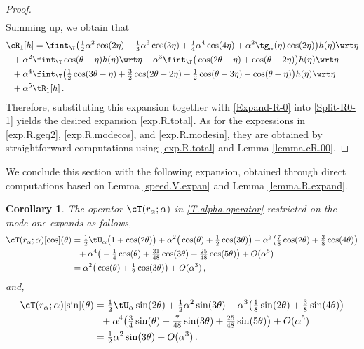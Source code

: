 \documentclass[a4paper,reqno,10pt]{article}
\newtheorem{cor}{Corollary}[section]
\begin{document}
\begin{proof}
\begin{align}
	\end{align}
Summing up, we obtain that
	\begin{align*}%
	&	\cR_{1}[h]  =   \fint_{\T} \big( \tfrac12 \alpha^2 \cos(2\eta) -\tfrac13 \alpha^3 \cos(3\eta) + \tfrac14 \alpha^4 \cos(4\eta) +\alpha^2 \tg_{\alpha}(\eta) \cos(2\eta)  \big) h(\eta) \wrt\eta \\
		& \ \  + {\alpha^2}\fint_{\T}\cos(\theta-\eta) h(\eta) \wrt \eta - {\alpha^3} \fint_{\T}\big( \cos(2\theta-\eta) + \cos(\theta-2\eta) \big)h(\eta) \wrt \eta  \\
	& \ \    + {\alpha^4} \fint_{\T} \big( \tfrac12\cos(3\theta-\eta) + \tfrac32\cos(2\theta-2\eta) +\tfrac12 \cos(\theta-3\eta)  -\cos(\theta+\eta) \big) h(\eta) \wrt\eta \\
	& \ \  + \alpha^5 \tR_{1}[h]\,.
	\end{align*}
Therefore, substituting this expansion together with \eqref{Expand-R-0} into \eqref{Split-R0-1} yields the desired expansion \eqref{exp.R.total}.
As for the expressions in \eqref{exp.R.geq2}, \eqref{exp.R.modecos}, and \eqref{exp.R.modesin}, they are obtained by straightforward computations using \eqref{exp.R.total} and Lemma \ref{lemma.cR.00}.
\end{proof}
We conclude this section with the following expansion, obtained through direct computations based on Lemma \ref{speed.V.expan} and Lemma \ref{lemma.R.expand}.
\begin{cor}\label{cor.T.at.cos}
	The operator $\cT(r_\alpha;\alpha)$ in \eqref{T.alpha.operator} restricted on the mode one expands as follows,
	\begin{align}
		 	\cT(r_\alpha;\alpha)[\cos](\theta) &=   \tfrac12\tU_{\alpha}\big( 1+\cos(2\theta) \big) + \alpha^2 \big( \cos(\theta)+\tfrac12\cos(3\theta)  \big)   -  \alpha^3 \big(   \tfrac78 \cos(2\theta) +\tfrac38 \cos(4\theta)\big) \\
		 	& \ \ + \alpha^4\big(-\tfrac14\cos(\theta)+ \tfrac{31}{48} \cos(3\theta) + \tfrac{25}{48} \cos(5\theta) \big) + O(\alpha^5)  \\
		 	& = \alpha^2 \big( \cos(\theta)+ \tfrac12\cos(3\theta)  \big) + O(\alpha^3) \,,
	\end{align}
	and,
		\begin{align}
		\cT(r_\alpha;\alpha)[\sin](\theta) &= \tfrac12\tU_{\alpha} \sin(2\theta)+ \tfrac12 \alpha^2 \sin(3\theta) -  \alpha^3 \big(  \tfrac18 \sin(2\theta) + \tfrac38 \sin(4\theta)  \big)    \\
		& \ \ + \alpha^4\big( \tfrac34\sin(\theta) - \tfrac{7}{48} \sin(3\theta) + \tfrac{25}{48} \sin(5\theta)  \big) + O(\alpha^5) \\
		& = \tfrac12 \alpha^2 \sin(3\theta) + O(\alpha^3) \,.
	\end{align}
\end{cor}
\end{document}
